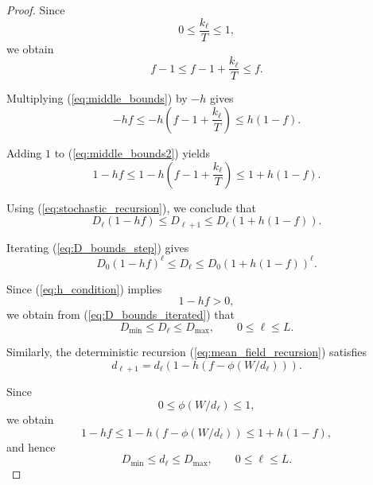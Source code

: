 \documentclass[10pt]{iopart}
\newcommand{\1}{\mathbf{1}}
\begin{document}
\begin{proof}

Since
\begin{equation}
0\le \frac{k_\ell}{T}\le 1,
\label{eq:k_bounds}
\end{equation}
we obtain
\begin{equation}
f-1
\le
f-1+\frac{k_\ell}{T}
\le
f.
\label{eq:middle_bounds}
\end{equation}

Multiplying (\ref{eq:middle_bounds}) by $-h$ gives
\begin{equation}
-hf
\le
-h\left(f-1+\frac{k_\ell}{T}\right)
\le
h(1-f).
\label{eq:middle_bounds2}
\end{equation}

Adding $1$ to (\ref{eq:middle_bounds2}) yields
\begin{equation}
1-hf
\le
1-h\left(f-1+\frac{k_\ell}{T}\right)
\le
1+h(1-f).
\label{eq:middle_bounds3}
\end{equation}

Using (\ref{eq:stochastic_recursion}), we conclude that
\begin{equation}
D_\ell(1-hf)
\le
D_{\ell+1}
\le
D_\ell(1+h(1-f)).
\label{eq:D_bounds_step}
\end{equation}

Iterating (\ref{eq:D_bounds_step}) gives
\begin{equation}
D_0(1-hf)^\ell
\le
D_\ell
\le
D_0(1+h(1-f))^\ell.
\label{eq:D_bounds_iterated}
\end{equation}

Since (\ref{eq:h_condition}) implies
\begin{equation}
1-hf>0,
\label{eq:positive_factor}
\end{equation}
we obtain from (\ref{eq:D_bounds_iterated}) that
\begin{equation}
D_{\min}\le D_\ell\le D_{\max},
\qquad
0\le \ell\le L.
\label{eq:D_interval}
\end{equation}

Similarly, the deterministic recursion (\ref{eq:mean_field_recursion}) satisfies
\begin{equation}
d_{\ell+1}
=
d_\ell
\left(
1-h(f-\phi(W/d_\ell))
\right).
\label{eq:d_step}
\end{equation}

Since
\begin{equation}
0\le \phi(W/d_\ell)\le 1,
\label{eq:phi_bounds}
\end{equation}
we obtain
\begin{equation}
1-hf
\le
1-h(f-\phi(W/d_\ell))
\le
1+h(1-f),
\label{eq:d_factor_bounds}
\end{equation}
and hence
\begin{equation}
D_{\min}\le d_\ell\le D_{\max},
\qquad
0\le \ell\le L.
\label{eq:d_interval}
\end{equation}


\end{proof}
\end{document}
